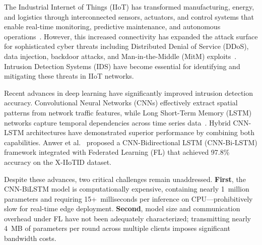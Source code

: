 \documentclass[preprint,12pt]{elsarticle}
\begin{document}
The Industrial Internet of Things (IIoT) has transformed manufacturing, energy, and logistics through interconnected sensors, actuators, and control systems that enable real-time monitoring, predictive maintenance, and autonomous operations~\cite{xu2014survey,boyes2018framework}. However, this increased connectivity has expanded the attack surface for sophisticated cyber threats including Distributed Denial of Service (DDoS), data injection, backdoor attacks, and Man-in-the-Middle (MitM) exploits~\cite{hassanzadeh2020review,zolanvari2019machine}. Intrusion Detection Systems (IDS) have become essential for identifying and mitigating these threats in IIoT networks.

Recent advances in deep learning have significantly improved intrusion detection accuracy. Convolutional Neural Networks (CNNs) effectively extract spatial patterns from network traffic features, while Long Short-Term Memory (LSTM) networks capture temporal dependencies across time series data~\cite{vinayakumar2017cnn,chawla2022hybrid}. Hybrid CNN-LSTM architectures have demonstrated superior performance by combining both capabilities. Anwer et al.~\cite{anwer2025advanced} proposed a CNN-Bidirectional LSTM (CNN-Bi-LSTM) framework integrated with Federated Learning (FL) that achieved 97.8\% accuracy on the X-IIoTID dataset.

Despite these advances, two critical challenges remain unaddressed. \textbf{First}, the CNN-BiLSTM model is computationally expensive, containing nearly 1~million parameters and requiring 15+~milliseconds per inference on CPU---prohibitively slow for real-time edge deployment. \textbf{Second}, model size and communication overhead under FL have not been adequately characterized; transmitting nearly 4~MB of parameters per round across multiple clients imposes significant bandwidth costs.
\end{document}
